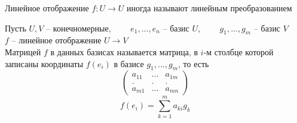 \begin{remark}
	Линейное отображение $ f : U \to U $ иногда называют линейным преобразованием
\end{remark}

\begin{definition}
	Пусть $ U, V $ -- конечномерные, $ \qquad e_1, ..., e_n $ -- базис $ U $, $ \qquad g_1, ..., g_m $ -- базис $ V $ \\
	$ f $ -- линейное отображение $ U \to V $ \\
    Матрицей $ f $ в данных базисах называется матрица, в $ i $-м столбце которой записаны координаты $ f(e_i) $ в базисе $ g_1, ..., g_m $, то есть
    $$
    \begin{pmatrix}
		a_{11} & ... & a_{1m} \\
        . & . & . \\
        a_{m1} & ... & a_{mn}
    \end{pmatrix} $$
    $$ f(e_i) = \sum_{k = 1}^{m} a_{ki}g_k $$
\end{definition}

